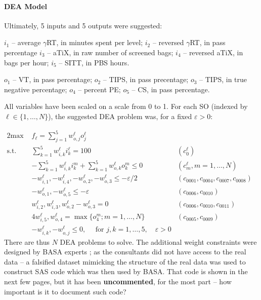 \paragraph{DEA Model}
Ultimately, 5 inputs and 5 outputs were suggested:
\begin{description}[noitemsep]
\item[Inputs] $i_1$ -- average $\gamma$RT, in minutes spent per level; $i_2$ -- reversed $\gamma$RT, in pass percentage $i_3$ -- aTiX, in raw number of screened bags; $i_4$ -- reversed aTiX, in bags per hour; $i_5$ -- SITT, in PBS hours.
\item[Outputs] $o_1$ -- VT, in pass percentage; $o_2$ -- TIPS, in pass precentage; $o_3$ -- TIPS, in true negative percentage; $o_4$ -- percent PE; $o_5$ -- CS, in pass percentage.
\end{description}
All variables have been scaled on a scale from 0 to 1. 
For each SO (indexed by $\ell\in\{1,\ldots,N\}$), the suggested DEA problem was, for a fixed $\varepsilon>0$: 

\begin{alignat*}{2}
    \text{max }   & f_{\ell}=\sum_{j=1}^5w^{\ell}_{o,j}o^{\ell}_j & &\  \\
    \text{s.t. } & \sum_{k=1}^{5}w^{\ell}_{i,k}i^{\ell}_k =100 & (c^{\ell}_0)& \\
    & -\sum_{k=1}^{5}w^{\ell}_{i,k}i^{m}_k + \sum_{k=1}^{5}w^{\ell}_{o,k}o^{m}_k \leq 0  & (c^{\ell}_m, m=1,\ldots,N) & \\
                       & -w^{\ell}_{i,1},-w^{\ell}_{i,4},-w^{\ell}_{o,2},-w^{\ell}_{o,3}\leq -\varepsilon/2 & (c_{0001},c_{0004},c_{0007},c_{0008}) & \\
                       & -w^{\ell}_{o,1},-w^{\ell}_{o,5}\leq -\varepsilon & (c_{0006},c_{0010}) & \\
                       & w^{\ell}_{i,2},w^{\ell}_{i,3},w^{\ell}_{o,2}-w^{\ell}_{o,3}=0 & (c_{0006},c_{0010},c_{0011}) & \\
                       & 4w^{\ell}_{i,5},w^{\ell}_{o,4}=\max\{o^{m}_4;m=1,\ldots,N\} & (c_{0005},c_{0009}) & \\
                       & -w^{\ell}_{i,k},-w^{\ell}_{o,j}\leq 0, \quad\text{ for }j,k=1,\ldots,5,\quad \varepsilon>0 & & 
  \end{alignat*}
There are thus $N$ DEA problems to solve. The additional weight constraints were designed by BASA experts ; as the consultants did not have access to the real data -- a falsified dataset mimicking the structure of the real data was used to construct SAS code which was then used by BASA. That code is shown in the next few pages, but it has been \textbf{uncommented}, for the most part -- how important is it to document such code? 

